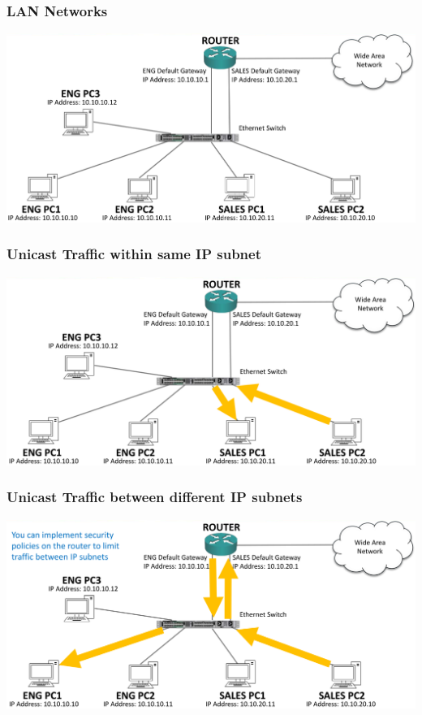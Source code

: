 \documentclass[pdflatex,compress,mathserif]{beamer}
\begin{document}
\begin{frame}
	\frametitle{LAN Networks}
	\begin{center}
		\includegraphics[width=\linewidth]{img/img09}
	\end{center}
\end{frame}

\begin{frame}
	\frametitle{Unicast Traffic within same IP subnet}
	\begin{center}
		\includegraphics[width=\linewidth]{img/img10}
	\end{center}
\end{frame}

\begin{frame}
	\frametitle{Unicast Traffic between different IP subnets}
	\begin{center}
		\includegraphics[width=\linewidth]{img/img11}
	\end{center}
\end{frame}
\end{document}
